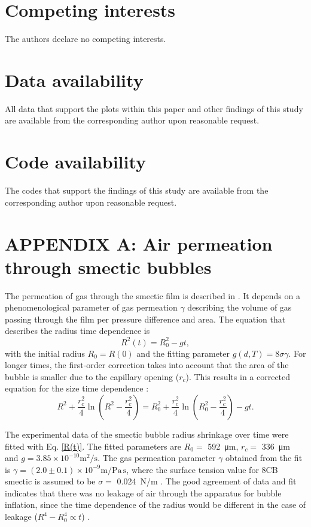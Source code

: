 \documentclass[a4paper,12pt]{article}
\begin{document}
	\section*{Competing interests}
	The authors declare no competing interests.
	
	\section*{Data availability}
	All data that support the plots within this paper and other findings of this study are available from the corresponding author upon reasonable request.
	
	\section*{Code availability}
	The codes that support the findings of this study are available from the corresponding author upon reasonable request.
	
	

	\section*{APPENDIX A: Air permeation through smectic bubbles}
	The permeation of gas through the smectic film is described in \cite{li2002gas}. It depends on a phenomenological parameter of gas permeation $\gamma$ describing the volume of gas passing through the film per pressure difference and area. The equation that describes the radius time dependence is 
 \begin{equation}
	R^2(t) = R_0^2 - gt, \label{R(t)_approx}
	\end{equation}
	with the initial radius $R_0=R(0)$ and the fitting parameter $g(d,T)=8\sigma\gamma $. For longer times, the first-order correction takes into account  that the area of the bubble is smaller due to the capillary opening ($r_c$). This results in a corrected equation for the size time dependence \cite{li2002gas}:
	\begin{equation}
	R^2+\frac{r_c^2}{4}\ln{\left(R^2-\frac{r_c^2}{4}\right)}=R_0^2+\frac{r_c^2}{4}\ln{\left(R_0^2-\frac{r_c^2}{4}\right)}-gt.
	\label{R(t)}
	\end{equation}
	
	The experimental data of the smectic bubble radius shrinkage over time were fitted with Eq. \eqref{R(t)}.  The fitted parameters are $R_0=$ \SI{592}{\um}, $r_c=$ \SI{336}{\um} and $g=3.85\times 10^{-10} \mathrm{m^2/s}$. The gas permeation parameter $\gamma$ obtained from the fit is $\gamma=(2.0\pm0.1)\times 10^{-9} \mathrm{m/Pa\,s}$, where the surface tension value for 8CB smectic is assumed to be $\sigma=$ \SI{0.024}{N/m} \cite{stannarius1997surface}.
	The good agreement of data and fit indicates that there was no leakage of air through the apparatus for bubble inflation, since the time dependence of the radius would be different in the case of leakage ($R^4 - R_0^4 \propto t$) \cite{li2002gas}.
\end{document}
